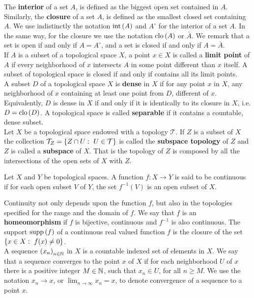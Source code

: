 The \textbf{interior} of a set $A$, is defined as the biggest open set contained in $A$. Similarly, the \textbf{closure} of a set $A$, is defined as the smallest closed set containing $A$. We use indistinctly the notation $\mathrm{int}\,(A)$ and $A^{\circ}$ for the interior of a set $A$. In the same way, for the closure we use the notation $\mathrm{clo}\,(A)$ or $\bar{A}$. We remark that a set is open if and only if $A=A^{\circ}$, and a set is closed if and only if $A=\bar{A}$.
\\

 If $A$ is a subset of a topological space $X$, a point $x\in X$ is called a \textbf{limit point} of $A$ if every neighborhood of $x$ intersects $A$ in some point different than $x$ itself. A subset of topological space is closed if and only if contains all its limit points.    
\\
A subset $D$ of a topological space $X$ is \textbf{dense} in $X$ if for any point $x$ in $X$, any neighborhood of $x$ containing at least one point from $D$, different of $x$. Equivalently, $D$ is dense in $X$ if and only if it is identically to its closure in $X$, i.e. $D=\mathrm{clo}\, (D)$. A topological space is called \textbf{separable} if it contains a countable, dense subset.
\\



Let $X$ be a topological space  endowed with a topology $\mathcal{T}$. If $Z$ is a subset of $X$ the collection $\mathcal{T}_Z=\left\lbrace Z\cap U: \ U \in \mathcal{T} \right\rbrace$ is called the \textbf{subspace topology} of $Z$ and $Z$ is called a \textbf{subspace} of $X$. That is the topology of $Z$ is composed by all the intersections of the open sets of $X$ with $Z$. 


\begin{definition}[Continuity]
Let $X$ and $Y$ be topological spaces. A function $f:X\rightarrow Y$ is said to be continuous if for each open subset $V$ of $Y$, the set $f^{-1}(V)$ is an open subset of $X$.\label{def: Continuity} 
\end{definition}
Continuity not only depends upon the function $f$, but also in the topologies specified for the range and the domain of $f$. We say that $f$ is an \textbf{homeomorphism} if $f$ is bijective, continuous and $f^{-1}$ is also continuous. The support $\mathrm{supp}\,(f)$ of a continuous real valued function $f$ is the closure of the set $\braces{x\in X:\ f(x)\neq 0}$.\\

A sequence $\left( x_n \right)_{n\in \mathbb{N}}$ in $X$ is a countable indexed set of elements in $X$. We say that a sequence converges to the point $x$ of $X$ if for each neighborhood $U$ of $x$ there is a positive integer $M\in\mathbb{N}$, such that $x_n\in U$, for all $n\geq M$. We use the notation $x_n\rightarrow x$, or $\lim_{n\rightarrow \infty} x_n = x$, to denote convergence of a sequence to a point $x$. \\

